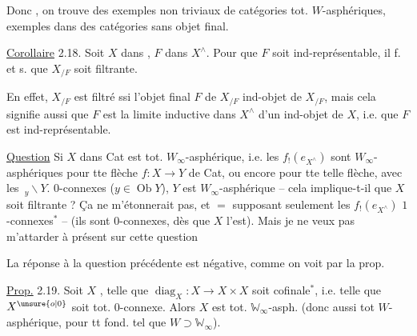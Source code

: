Donc , on trouve des exemples non triviaux de catégories tot. $W$-asphériques,  exemples dans des catégories sans objet final.

\reversemarginpar{}\normalmarginpar

\uline{Corollaire} 2.18. Soit $X$ dans , $F$ dans $X^\wedge$. Pour que $F$ soit ind-représentable, il f. et s. que $X_{/F}$ soit filtrante.

En effet,  $X_{/F}$ est filtré ssi l'objet final $F$ de $X_{/F}$    ind-objet de $X_{/F}$, mais cela signifie aussi que $F$ est la limite inductive dans $X^\wedge$ d'un ind-objet de $X$, i.e. que $F$ est ind-représentable.


\uline{Question} Si $X$ dans Cat est tot. $W_\infty$-asphérique, i.e. les $f_!(e_{X^\wedge})$ sont $W_\infty$-asphériques pour tte flèche $f:X\to Y$ de Cat, ou encore pour tte telle flèche, avec les $\,{}_{y}\backslash Y$. $0$-connexes ($y\in\operatorname{Ob}Y$), $Y$ est $W_\infty$-asphérique -- cela implique-t-il que $X$ soit  filtrante ? Ça ne m'étonnerait pas, et $=$  supposant seulement les $f_!(e_{X^\wedge})$ $1$-connexes$^*$ -- (ils sont $0$-connexes, dès que $X$ l'est). Mais je ne veux pas m'attarder à présent sur cette question\unsure{\ldots}

\reversemarginpar{}\normalmarginpar

\reversemarginpar{}\normalmarginpar

La réponse à la question précédente est négative, comme on voit par la prop.

\reversemarginpar{}\normalmarginpar

\uline{Prop.} 2.19. Soit $X$  , telle que $\operatorname{diag}_X:X\to X\times X$ soit cofinale$^*$, i.e. telle que $X^{\unsure{o|0}}$ soit tot. $0$-connexe. Alors $X$ est tot. $\mathbb W_\infty$-asph. (donc aussi tot $W$-asphérique, pour tt  fond.  tel que $W\supset\mathbb W_\infty$).

